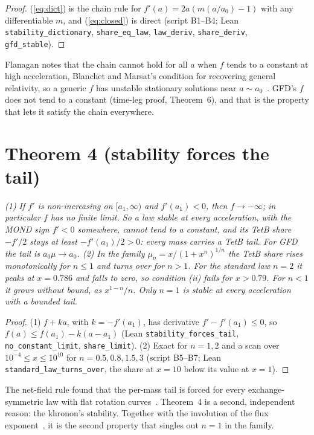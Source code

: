 \documentclass[twocolumn]{iopjournal}
\begin{document}
\begin{proof}
(\ref{eq:dict}) is the chain rule for $f'(a) = 2a(m(a/a_0) - 1)$ with
any differentiable $m$, and (\ref{eq:closed}) is direct (script
B1--B4; Lean \texttt{stability\_dictionary}, \texttt{share\_eq\_law},
\texttt{law\_deriv}, \texttt{share\_deriv}, \texttt{gfd\_stable}).
\end{proof}

Flanagan notes that the chain cannot hold for all $a$ when $f$ tends
to a constant at high acceleration, Blanchet and Marsat's condition
for recovering general relativity, so a generic $f$ has unstable
stationary solutions near $a \sim a_0$~\cite{Flanagan2023}. GFD's $f$
does not tend to a constant (time-leg proof, Theorem~6), and that is
the property that lets it satisfy the chain everywhere.


\section*{Theorem 4 (stability forces the tail)}

\emph{(1) If $f'$ is non-increasing on $[a_1, \infty)$ and
$f'(a_1) < 0$, then $f \to -\infty$; in particular $f$ has no finite
limit. So a law stable at every acceleration, with the MOND sign
$f' < 0$ somewhere, cannot tend to a constant, and its TetB share
$-f'/2$ stays at least $-f'(a_1)/2 > 0$: every mass carries a TetB
tail. For GFD the tail is $a_0\mu \to a_0$.
(2) In the family $\mu_n = x/(1+x^n)^{1/n}$ the TetB share rises
monotonically for $n \le 1$ and turns over for $n > 1$. For the
standard law $n = 2$ it peaks at $x = 0.786$ and falls to zero, so
condition (ii) fails for $x > 0.79$. For $n < 1$ it grows without
bound, as $x^{1-n}/n$. Only $n = 1$ is stable at every acceleration
with a bounded tail.}

\begin{proof}
(1) $f + ka$, with $k = -f'(a_1)$, has derivative
$f' - f'(a_1) \le 0$, so $f(a) \le f(a_1) - k(a - a_1)$ (Lean
\texttt{stability\_forces\_tail}, \texttt{no\_constant\_limit},
\texttt{share\_limit}). (2) Exact for $n = 1, 2$ and a scan over
$10^{-4} \le x \le 10^{10}$ for $n = 0.5, 0.8, 1.5, 3$ (script B5--B7;
Lean \texttt{standard\_law\_turns\_over}, the share at $x = 10$
below its value at $x = 1$).
\end{proof}

The net-field rule found that the per-mass tail is forced for every
exchange-symmetric law with flat rotation curves~\cite{NelsonNFR}.
Theorem~4 is a second, independent reason: the khronon's stability.
Together with the involution of the flux exponent~\cite{NelsonNFR},
it is the second property that singles out $n = 1$ in the family.
\end{document}
